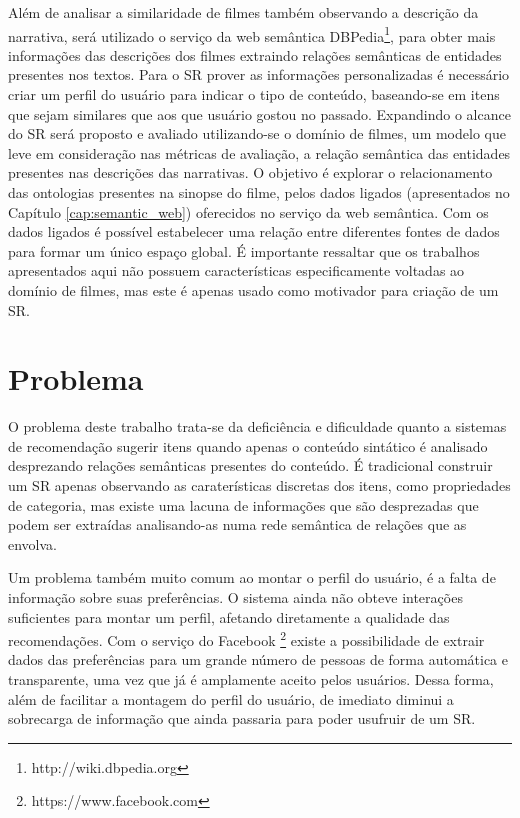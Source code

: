 Além de analisar a similaridade de filmes também observando a descrição da narrativa, será utilizado o serviço da web semântica DBPedia\footnote{http://wiki.dbpedia.org}, para obter mais informações das descrições dos filmes extraindo relações semânticas de entidades presentes nos textos. Para o SR prover as informações personalizadas é necessário criar um perfil do usuário para indicar o tipo de conteúdo, baseando-se em itens que sejam similares que aos que usuário gostou no passado. Expandindo o alcance do SR será proposto e avaliado utilizando-se o domínio de filmes, um modelo que leve em consideração nas métricas de avaliação, a relação semântica das entidades presentes nas descrições das narrativas. O objetivo é explorar o relacionamento das ontologias presentes na sinopse do filme, pelos dados ligados (apresentados no Capítulo \ref{cap:semantic_web}) oferecidos no serviço da web semântica. Com os dados ligados é possível estabelecer uma relação entre diferentes fontes de dados para formar um único espaço global. É importante ressaltar que os trabalhos apresentados aqui não possuem características especificamente voltadas ao domínio de filmes, mas este é apenas usado como motivador para criação de um SR.

\section{Problema}
O problema deste trabalho trata-se da deficiência e dificuldade quanto a sistemas de recomendação sugerir itens quando apenas o conteúdo sintático é analisado desprezando relações semânticas presentes do conteúdo. É tradicional construir um SR apenas observando as caraterísticas discretas dos itens, como propriedades de categoria, mas existe uma lacuna de informações que são desprezadas que podem ser extraídas analisando-as numa rede semântica de relações que as envolva.

Um problema também muito comum ao montar o perfil do usuário, é a falta de informação sobre suas preferências. O sistema ainda não obteve interações suficientes para montar um perfil, afetando diretamente a qualidade das recomendações. Com o serviço do Facebook \footnote{https://www.facebook.com} existe a possibilidade de extrair dados das preferências para um grande número de pessoas de forma automática e transparente, uma vez que já é amplamente aceito pelos usuários. Dessa forma, além de facilitar a montagem do perfil do usuário, de imediato diminui a sobrecarga de informação que ainda passaria para poder usufruir de um SR.

